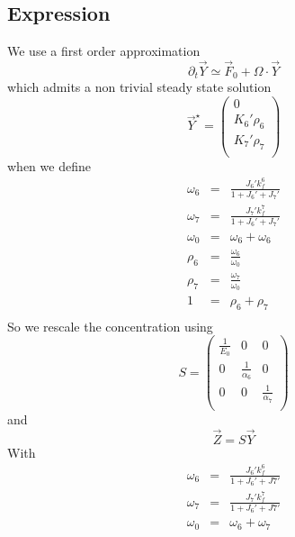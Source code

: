 \documentclass[aps,onecolumn,11pt]{revtex4}
\begin{document}
\subsection{Expression}
We use a first order approximation
\begin{equation}
		\partial_t \vec{Y} \simeq \vec{F}_0 + \Omega\cdot\vec{Y}
\end{equation}
which admits a non trivial steady state solution
\begin{equation}
	\vec{Y}^\star = \begin{pmatrix}
	0\\
	K_6' \rho_6\\
	K_7'\rho_7\\
	\end{pmatrix}
\end{equation}
when we define
\begin{equation}
	\begin{array}{rcl}
	\omega_6 & = & \frac{J_6' k_f^6}{1+J_6'+J_7'}\\
	\omega_7 & = & \frac{J_7' k_f^7}{1+J_6'+J_7'}\\
	\omega_0 & = & \omega_6+\omega_6\\
	\rho_6   & = & \frac{\omega_6}{\omega_0}\\
	\rho_7   & = & \frac{\omega_7}{\omega_0}\\
	1        & = & \rho_6 + \rho_7\\
	\end{array}
\end{equation}
So we rescale the concentration using
\begin{equation}
	S = 
	\begin{pmatrix}
	\frac{1}{E_0} & 0 & 0 \\
	0 & \frac{1}{\alpha_6}&0\\
	0 & 0 & \frac{1}{\alpha_7}\\
	\end{pmatrix}
\end{equation}
and
\begin{equation}
	\vec{Z} = S \vec{Y}%
\end{equation}
With
\begin{equation}
\begin{array}{rcl}
	\omega_6 & = & \frac{J_6'k_f^6}{1+J_6'+J7'}\\
	\omega_7 & = & \frac{J_7'k_f^7}{1+J_6'+J7'}\\
	\omega_0 & = & \omega_6+\omega_7\\
\end{array}
\end{equation}
\end{document}
